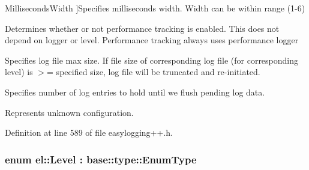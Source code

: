 \begin{Desc}
\begin{description}
{\hypertarget{namespaceel_a281f5db6d6163678bc68a8b23b59e124a052bf0f0c813b3c41c5b5046ebc26529}{}Milliseconds\+Width\label{namespaceel_a281f5db6d6163678bc68a8b23b59e124a052bf0f0c813b3c41c5b5046ebc26529}
}]Specifies milliseconds width. Width can be within range (1-\/6) \item[{\em 
\hypertarget{namespaceel_a281f5db6d6163678bc68a8b23b59e124abe9e43d200c5698cb8519daed7035874}{}Performance\+Tracking\label{namespaceel_a281f5db6d6163678bc68a8b23b59e124abe9e43d200c5698cb8519daed7035874}
}]Determines whether or not performance tracking is enabled. This does not depend on logger or level. Performance tracking always uses \textquotesingle{}performance\textquotesingle{} logger \item[{\em 
\hypertarget{namespaceel_a281f5db6d6163678bc68a8b23b59e124a4b35e615142d60db6383426f051e700b}{}Max\+Log\+File\+Size\label{namespaceel_a281f5db6d6163678bc68a8b23b59e124a4b35e615142d60db6383426f051e700b}
}]Specifies log file max size. If file size of corresponding log file (for corresponding level) is $>$= specified size, log file will be truncated and re-\/initiated. \item[{\em 
\hypertarget{namespaceel_a281f5db6d6163678bc68a8b23b59e124ac1b4aae5c168e64292c9aa87a124ae86}{}Log\+Flush\+Threshold\label{namespaceel_a281f5db6d6163678bc68a8b23b59e124ac1b4aae5c168e64292c9aa87a124ae86}
}]Specifies number of log entries to hold until we flush pending log data. \item[{\em 
\hypertarget{namespaceel_a281f5db6d6163678bc68a8b23b59e124a88183b946cc5f0e8c96b2e66e1c74a7e}{}Unknown\label{namespaceel_a281f5db6d6163678bc68a8b23b59e124a88183b946cc5f0e8c96b2e66e1c74a7e}
}]Represents unknown configuration. \end{description}
\end{Desc}


Definition at line 589 of file easylogging++.\+h.

\hypertarget{namespaceel_ab0ac6091262344c52dd2d3ad099e8e36}{}
\subsubsection[{Level}]{\setlength{\rightskip}{0pt plus 5cm}enum {\bf el\+::\+Level} \+: {\bf base\+::type\+::\+Enum\+Type}\hspace{0.3cm}{\ttfamily [strong]}}\label{namespaceel_ab0ac6091262344c52dd2d3ad099e8e36}


